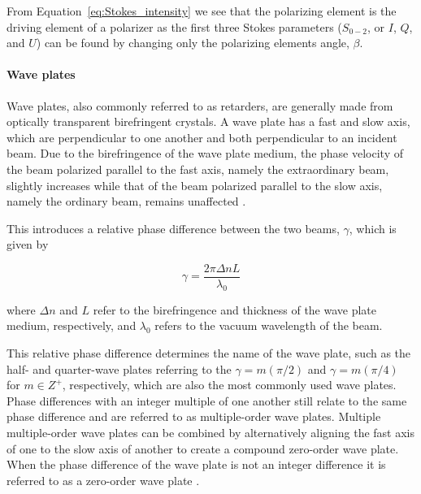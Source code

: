 From Equation~\ref{eq:Stokes_intensity} we see that the polarizing element is the driving element of a polarizer as the first three Stokes parameters ($S_{0-2}$, or $I$, $Q$, and $U$) can be found by changing only the polarizing elements angle, $\beta$.

\paragraph{Wave plates}
Wave plates, also commonly referred to as retarders, are generally made from optically transparent birefringent crystals. A wave plate has a fast and slow axis, which are perpendicular to one another and both perpendicular to an incident beam. Due to the birefringence of the wave plate medium, the phase velocity of the beam polarized parallel to the fast axis, namely the extraordinary beam, slightly increases while that of the beam polarized parallel to the slow axis, namely the ordinary beam, remains unaffected \citep{Hecht_optics}.
\prgph

This introduces a relative phase difference between the two beams, $\gamma$, which is given by

\begin{equation}
    \gamma = \frac{2 \pi \Delta n L}{\lambda_{0}}
\end{equation}

\noindent where $\Delta n$ and $L$ refer to the birefringence and thickness of the wave plate medium, respectively, and $\lambda_{0}$ refers to the vacuum wavelength of the beam.
\prgph

This relative phase difference determines the name of the wave plate, such as the half- and quarter-wave plates referring to the $\gamma = m(\pi/2) $ and $\gamma = m(\pi/4)$ for $m \in Z^{+}$, respectively, which are also the most commonly used wave plates. Phase differences with an integer multiple of one another still relate to the same phase difference and are referred to as multiple-order wave plates. Multiple multiple-order wave plates can be combined by alternatively aligning the fast axis of one to the slow axis of another to create a compound zero-order wave plate. When the phase difference of the wave plate is not an integer difference it is referred to as a zero-order wave plate \citep{Hale_birefringence}.

